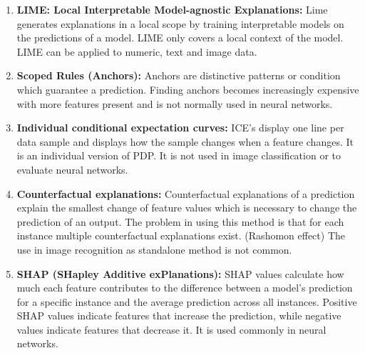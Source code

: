 \begin{enumerate}
	\item \textbf{LIME: Local Interpretable Model-agnostic Explanations:} Lime generates explanations in a local scope by training interpretable models on the predictions of a model. LIME only covers a local context of the model. LIME can be applied to numeric, text and image data.
	\item \textbf{Scoped Rules (Anchors):} Anchors are distinctive patterns or condition which guarantee a prediction. Finding anchors becomes increasingly expensive with more features present and is not normally used in neural networks. \cite{ribeiro2018}
	\item \textbf{Individual conditional expectation curves:} ICE's display one line per data sample and displays how the sample changes when a feature changes. It is an individual version of PDP. \cite{goldstein2014peeking} It is not used in image classification or to evaluate neural networks.
	\item \textbf{Counterfactual explanations:} Counterfactual explanations of a prediction explain the smallest change of feature values which is necessary to change the prediction of an output. The problem in using this method is that for each instance multiple counterfactual explanations exist. (Rashomon effect) The use in image recognition as standalone method is not common.
	\item \textbf{SHAP (SHapley Additive exPlanations):} SHAP values calculate how much each feature contributes to the difference between a model's prediction for a specific instance and the average prediction across all instances. Positive SHAP values indicate features that increase the prediction, while negative values indicate features that decrease it. It is used commonly in neural networks.
\end{enumerate}

